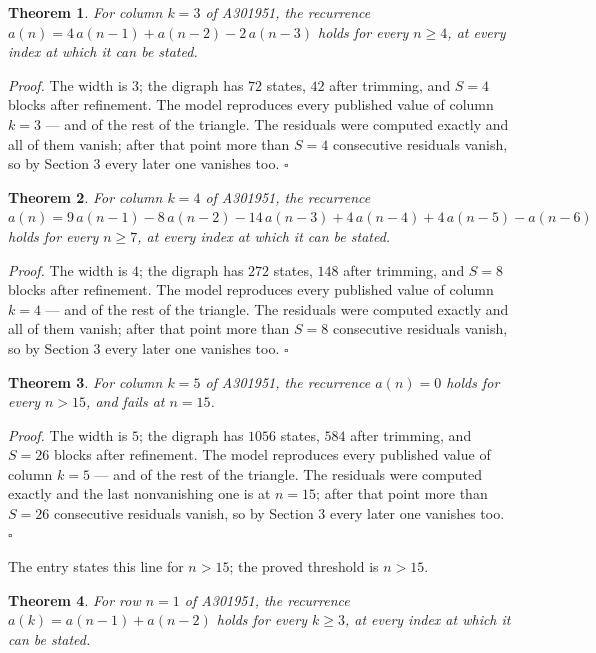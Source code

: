 \documentclass[11pt]{article}
\newtheorem{theorem}{Theorem}
\theoremstyle{definition}
\begin{document}
\begin{theorem} For column $k = 3$ of A301951, the recurrence $a(n) = 4\,a(n-1) + a(n-2) - 2\,a(n-3)$ holds for every $n \ge 4$, at every index at which it can be stated.\end{theorem}

{\itshape Proof.} The width is $3$; the digraph has $72$ states, $42$ after trimming, and $S = 4$ blocks after refinement. The model reproduces every published value of column $k = 3$ --- and of the rest of the triangle. The residuals were computed exactly and all of them vanish; after that point more than $S = 4$ consecutive residuals vanish, so by Section 3 every later one vanishes too. $\square$

\begin{theorem} For column $k = 4$ of A301951, the recurrence $a(n) = 9\,a(n-1) - 8\,a(n-2) - 14\,a(n-3) + 4\,a(n-4) + 4\,a(n-5) - a(n-6)$ holds for every $n \ge 7$, at every index at which it can be stated.\end{theorem}

{\itshape Proof.} The width is $4$; the digraph has $272$ states, $148$ after trimming, and $S = 8$ blocks after refinement. The model reproduces every published value of column $k = 4$ --- and of the rest of the triangle. The residuals were computed exactly and all of them vanish; after that point more than $S = 8$ consecutive residuals vanish, so by Section 3 every later one vanishes too. $\square$

\begin{theorem} For column $k = 5$ of A301951, the recurrence $a(n) = 0$ holds for every $n > 15$, and fails at $n = 15$.\end{theorem}

{\itshape Proof.} The width is $5$; the digraph has $1056$ states, $584$ after trimming, and $S = 26$ blocks after refinement. The model reproduces every published value of column $k = 5$ --- and of the rest of the triangle. The residuals were computed exactly and the last nonvanishing one is at $n = 15$; after that point more than $S = 26$ consecutive residuals vanish, so by Section 3 every later one vanishes too. $\square$

The entry states this line for $n > 15$; the proved threshold is $n > 15$.

\begin{theorem} For row $n = 1$ of A301951, the recurrence $a(k) = a(n-1) + a(n-2)$ holds for every $k \ge 3$, at every index at which it can be stated.\end{theorem}
\end{document}

